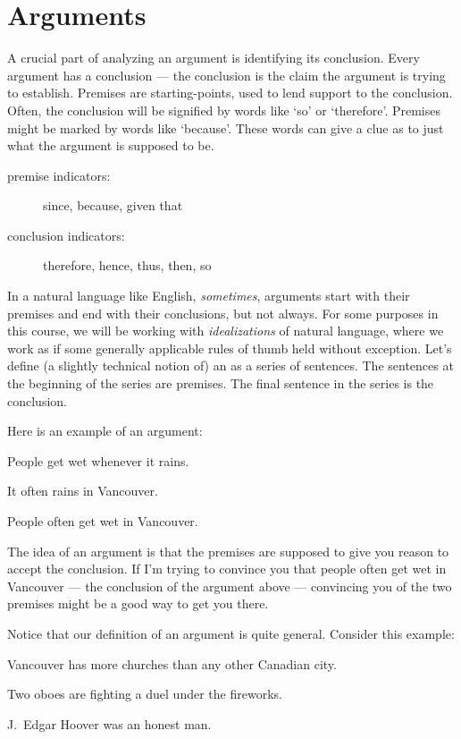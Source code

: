 \section{Arguments}
A crucial part of analyzing an argument is identifying its conclusion. Every argument has a conclusion --- the conclusion is the claim the argument is trying to establish. Premises are starting-points, used to lend support to the conclusion. Often, the conclusion will be signified by words like `so' or `therefore'. Premises might be marked by words like `because'. These words can give a clue as to just what the argument is supposed to be.

\begin{description}
\item[premise indicators:] since, because, given that
\item[conclusion indicators:] therefore, hence, thus, then, so
\end{description}

In a natural language like English, \emph{sometimes}, arguments start with their premises and end with their conclusions, but not always. For some purposes in this course, we will be working with \emph{idealizations} of natural language, where we work as if some generally applicable rules of thumb held without exception. Let's define (a slightly technical notion of) an  as a series of sentences. The sentences at the beginning of the series are premises. The final sentence in the series is the conclusion.

Here is an example of an argument:

\begin{earg}
\item[] People get wet whenever it rains.
\item[] It often rains in Vancouver.
\item[\therefore] People often get wet in Vancouver.
\end{earg}

The idea of an argument is that the premises are supposed to give you reason to accept the conclusion. If I'm trying to convince you that people often get wet in Vancouver --- the conclusion of the argument above --- convincing you of the two premises might be a good way to get you there.

Notice that our definition of an argument is quite general. Consider this example:
\begin{earg}
\item[] Vancouver has more churches than any other Canadian city.
\item[] Two oboes are fighting a duel under the fireworks.
\item[\therefore] J.\ Edgar Hoover was an honest man.
\end{earg}

